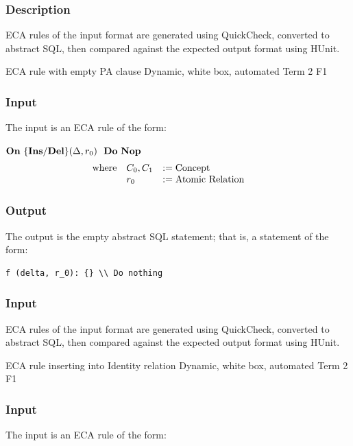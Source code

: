 \documentclass[12pt]{report}
\begin{document}
\vspace{-12pt}\subsubsection*{Description}

ECA rules of the input format are generated using QuickCheck, converted to
  abstract SQL, then compared against the expected output format using HUnit.

{ECA rule with empty PA clause} 
{Dynamic, white box, automated}  
{Term 2}
{F1}
\vspace{-12pt}\subsubsection*{Input}
The input is an ECA rule of the form:

$\mathbf{On~} \mathbf{\{Ins/Del\}}(\Delta,r_0) \,\,\,\,\mathbf{Do~} \mathbf{Nop~} $
\vspace{-10pt}\[\hspace{-20pt}\begin{array}{lll}
\text{where} & C_0, C_1 & := \text{Concept} \\ 
             & r_0      & := \text{Atomic Relation} \\ 
\end{array}\]

\vspace{-12pt}\subsubsection*{Output}

The output is the empty abstract SQL statement; that is, a statement of the form:
\begin{verbatim}
f (delta, r_0): {} \\ Do nothing
\end{verbatim}

\vspace{-12pt}\subsubsection*{Input}

ECA rules of the input format are generated using QuickCheck, converted to
  abstract SQL, then compared against the expected output format using HUnit.


{ECA rule inserting into Identity relation} 
{Dynamic, white box, automated}  
{Term 2}
{F1}
\vspace{-12pt}\subsubsection*{Input}
The input is an ECA rule of the form:
\end{document}
